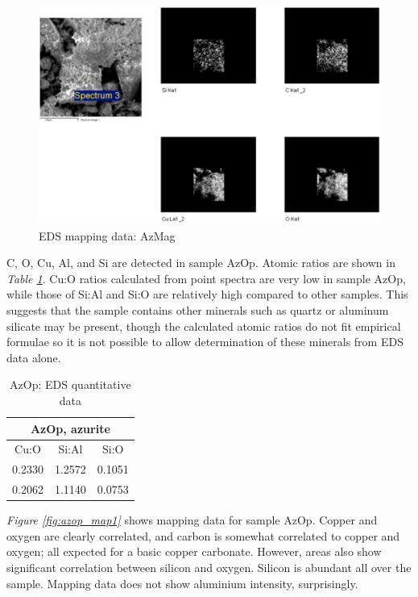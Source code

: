 \begin{figure}[H]
\centering
  \includegraphics[width=0.9\linewidth]{AzMag_EDS_map1_260221_imgs}
\caption[EDS mapping data: AzMag]{EDS mapping data: AzMag}
\label{fig:azmag_map1}
\end{figure}



C, O, Cu, Al, and Si are detected in sample AzOp. Atomic ratios are shown in \textit{Table \ref{table:azop_ratios}}. Cu:O ratios calculated from point spectra are very low in sample AzOp, while those of Si:Al and Si:O are relatively high compared to other samples. This suggests that the sample contains other minerals such as quartz or aluminum silicate may be present, though the calculated atomic ratios do not fit empirical formulae so it is not possible to allow determination of these minerals from EDS data alone.

\begin{table}[H]
\caption{AzOp: EDS quantitative data}
\centering
\label{table:azop_ratios}
\begin{tabular}{c c c}
\toprule
\multicolumn{3}{c}{AzOp, azurite} \\
\midrule
Cu:O & Si:Al & Si:O \\
\midrule
0.2330 & 1.2572 & 0.1051 \\
0.2062 & 1.1140 & 0.0753 \\
\bottomrule
\end{tabular}
\end{table}

\textit{Figure \ref{fig:azop_map1}} shows mapping data for sample AzOp. Copper and oxygen are clearly correlated, and carbon is somewhat correlated to copper and oxygen; all expected for a basic copper carbonate. However, areas also show significant correlation between silicon and oxygen. Silicon is abundant all over the sample. Mapping data does not show aluminium intensity, surprisingly. 

